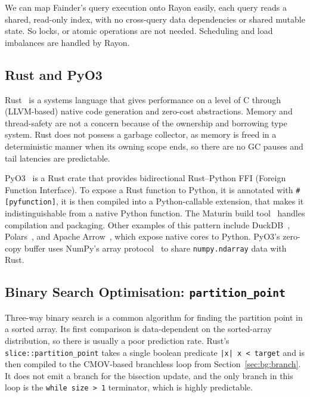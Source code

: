 We can map Fainder's query execution onto Rayon easily, each query reads a shared, read-only index, with no cross-query data dependencies or shared mutable state. So locks, or atomic operations are not needed. Scheduling and load imbalances are handled by Rayon.

\subsection{Rust and PyO3\label{sec:bg:rust}}

Rust~\cite{matsakis_2014} is a systems language that gives performance on a level of C through (LLVM-based) native code generation and zero-cost abstractions. Memory and thread-safety are not a concern because of the ownership and borrowing type system. Rust does not possess a garbage collector, as memory is freed in a deterministic manner when its owning scope ends, so there are no GC pauses and tail latencies are predictable.

PyO3~\cite{pyo3} is a Rust crate that provides bidirectional Rust--Python FFI (Foreign Function Interface). To expose a Rust function to Python, it is annotated with \texttt{\#[pyfunction]}, it is then compiled into a Python-callable extension, that makes it indistinguishable from a native Python function. The Maturin build tool~\cite{maturin} handles compilation and packaging. Other examples of this pattern include DuckDB~\cite{raasveldt_2019}, Polars~\cite{polars}, and Apache Arrow~\cite{apache_arrow}, which expose native cores to Python. PyO3's zero-copy buffer uses NumPy's array protocol~\cite{harris_2020} to share \texttt{numpy.ndarray} data with Rust.

\subsection{Binary Search Optimisation: \texttt{partition\_point}\label{sec:bg:partition_point}}

Three-way binary search is a common algorithm for finding the partition point in a sorted array. Its first comparison is data-dependent on the sorted-array distribution, so there is usually a poor prediction rate. Rust's \texttt{slice::partition\_point} takes a single boolean predicate \texttt{|x| x < target} and is then compiled to the CMOV-based branchless loop from Section~\ref{sec:bg:branch}.  It does not emit a branch for the bisection update, and the only branch in this loop is the \texttt{while size > 1} terminator, which is highly predictable.


